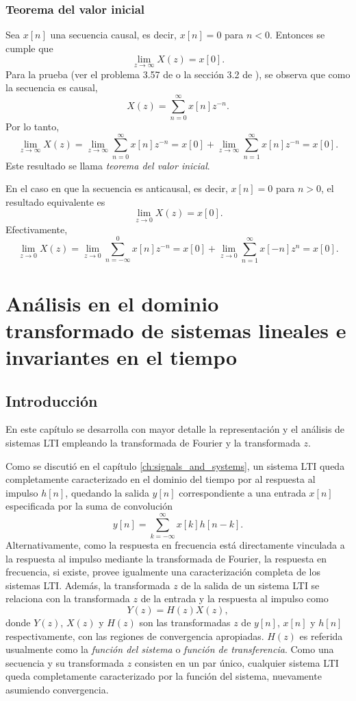 \documentclass[a4paper]{report}
\begin{document}
\subsection{Teorema del valor inicial} 

Sea \(x[n]\) una secuencia causal, es decir, \(x[n]=0\) para \(n<0\). Entonces se cumple que 
\[
 \lim_{z\to\infty}X(z)=x[0].
\]
Para la prueba (ver el problema 3.57 de \cite{oppenheim2009discrete} o la sección 3.2 de \cite{proakis06digital}), se observa que como la secuencia es causal,
\[
 X(z)=\sum_{n=0}^\infty x[n]z^{-n}.
\]
Por  lo tanto,
\[
 \lim_{z\to\infty}X(z)=\lim_{z\to\infty}\sum_{n=0}^\infty x[n]z^{-n}=x[0]+\lim_{z\to\infty}\sum_{n=1}^\infty x[n]z^{-n}=x[0].
\]
Este resultado se llama \emph{teorema del valor inicial}.

En el caso en que la secuencia es anticausal, es decir, \(x[n]=0\) para \(n>0\), el resultado equivalente es
\[
 \lim_{z\to0}X(z)=x[0].
\]
Efectivamente,
\[
 \lim_{z\to0}X(z)=\lim_{z\to0}\sum_{n=-\infty}^0 x[n]z^{-n}=x[0]+\lim_{z\to0}\sum_{n=1}^\infty x[-n]z^{n}=x[0].
\]


\chapter{Análisis en el dominio transformado de sistemas lineales e invariantes en el tiempo}

\section{Introducción}

En este capítulo se desarrolla con mayor detalle la representación y el análisis de sistemas LTI empleando la transformada de Fourier y la transformada \(z\).

Como se discutió en el capítulo \ref{ch:signals_and_systems}, un sistema LTI queda completamente caracterizado en el dominio del tiempo por al respuesta al impulso \(h[n]\), quedando la salida \(y[n]\) correspondiente a una entrada \(x[n]\) especificada por la suma de convolución
\[
 y[n]=\sum_{k=-\infty}^\infty x[k]h[n-k].
\]
Alternativamente, como la respuesta en frecuencia está directamente vinculada a la respuesta al impulso mediante la transformada de Fourier, la respuesta en frecuencia, si existe, provee igualmente una caracterización completa de los sistemas LTI. Además, la transformada \(z\) de la salida de un sistema LTI se relaciona con la transformada \(z\) de la entrada y la respuesta al impulso como
\begin{equation}\label{eq:transform_analysis_input_output_system_function_lti}
 Y(z)=H(z)X(z), 
\end{equation}
donde \(Y(z)\), \(X(z)\) y \(H(z)\) son las transformadas \(z\) de \(y[n]\), \(x[n]\) y \(h[n]\) respectivamente, con las regiones de convergencia apropiadas. \(H(z)\) es referida usualmente como la \emph{función del sistema} o \emph{función de transferencia}. Como una secuencia y su transformada \(z\) consisten en un par único, cualquier sistema LTI queda completamente caracterizado por la función del sistema, nuevamente asumiendo convergencia.
\end{document}
